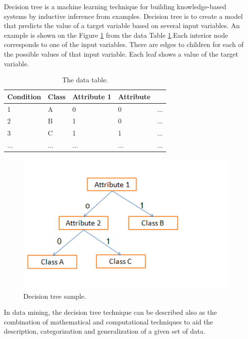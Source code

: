 Decision tree is a machine learning technique for building knowledge-based systems by inductive inference from examples. Decision tree is to create a model that predicts the value of a target variable based on several input variables. An example is shown on the Figure \ref{fig:decisiontreesample} from the data Table \ref{table:decisiontreesampletable}.Each interior node corresponds to one of the input variables. There are edges to children for each of the possible values of that input variable. Each leaf shows a value of the target variable.
\begin{table}
  \begin{center}
    \begin{tabular}{ | l | l | l | l | l }
     \hline
    Condition & Class & Attribute 1 &  Attribute \\ \hline
    1 & A & 0 & 0 & ... \\ 
	2 & B & 1 & 0 & ... \\ 
	3 & C & 1 & 1 & ... \\ 
	... & ... & ... & ... & ... \\ 


    \end{tabular}
	\end{center}
     \caption{The data table.}
    \label{table:decisiontreesampletable}
\end{table}

\begin{figure}[httb]
\centering
\includegraphics[width=1\textwidth]{graph/decisiontreesample.png}
\caption{Decision tree sample.}
\label{fig:decisiontreesample}
\end{figure}

In data mining, the decision tree technique can be described also as the combination of mathematical and computational techniques to aid the description, categorization and generalization of a given set of data.

